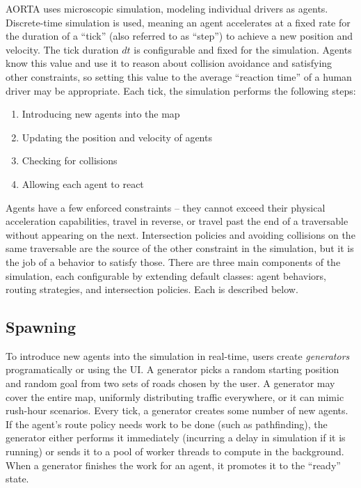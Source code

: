 \documentclass[letterpaper, 10 pt, conference]{ieeeconf}  %
\begin{document}
AORTA uses microscopic simulation, modeling individual drivers as agents.
Discrete-time simulation is used, meaning an agent accelerates at a fixed rate
for the duration of a ``tick'' (also referred to as ``step'') to achieve a new
position and velocity. The tick duration $dt$ is configurable and fixed
 for the simulation.
Agents know this value and use it to reason about collision avoidance and
satisfying other constraints, so setting this value to the average ``reaction
time'' of a human driver may be appropriate. Each tick, the simulation performs
the following steps:

\begin{enumerate}
  \item Introducing new agents into the map
  \item Updating the position and velocity of agents
  \item Checking for collisions
  \item Allowing each agent to react
\end{enumerate}

Agents have a few enforced constraints -- they cannot exceed their physical
acceleration capabilities, travel in reverse, or travel past the end of a
traversable without appearing on the next. Intersection policies and avoiding
collisions on the same traversable are the source of the other constraint in the
simulation, but it is the job of a behavior to satisfy those. There are three
main components of the simulation, each configurable by extending default
classes: agent behaviors, routing strategies, and intersection policies. Each
is described below.


\subsection{Spawning}


To introduce new agents into the simulation in real-time, users create
\emph{generators} programatically or using the UI. A generator picks a random
starting position and random goal from two sets of roads chosen by the user. A
generator may cover the entire map, uniformly distributing traffic everywhere,
or it can mimic rush-hour scenarios. Every tick, a generator creates some number
of new agents.  If the agent's route policy needs work to be done (such as
pathfinding), the generator either performs it immediately (incurring a delay in
simulation if it is running) or sends it to a pool of worker threads to compute
in the background. When a generator finishes the work for an agent, it promotes
it to the ``ready'' state.
\end{document}
